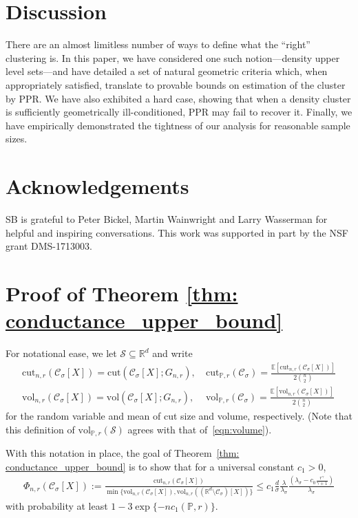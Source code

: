 \documentclass[11pt,twoside]{article}
\newcommand{\vol}{\mathrm{vol}}
\newcommand{\cut}{\mathrm{cut}}
\newcommand{\Reals}{\mathbb{R}}
\newcommand{\Rd}{\Reals^d}
\newcommand{\1}{\mathbf{1}}
\newcommand{\Xbf}{X}             %
\newcommand{\Pbb}{\mathbb{P}}
\newcommand{\Sset}{\mathcal{S}}
\newcommand{\Cset}{\mathcal{C}}
\newcommand{\Csig}{\Cset_{\sigma}}
\begin{document}
\section{Discussion}
\label{sec: discussion}

There are an almost limitless number of ways to define what the ``right''
clustering is. In this paper, we have considered one such notion---density upper
level sets---and have detailed a set of natural geometric criteria which, when 
appropriately satisfied, translate to provable bounds on estimation of the
cluster by PPR. We have also exhibited a hard case, showing that when a density cluster is sufficiently geometrically ill-conditioned, PPR may fail to recover it. Finally, we have empirically demonstrated the tightness of our analysis for reasonable sample sizes. 

\section{Acknowledgements}
SB is grateful to Peter Bickel, Martin Wainwright and Larry Wasserman for helpful and inspiring conversations. This work was supported in part by the NSF grant DMS-1713003.

\appendix

\section{Proof of Theorem \ref{thm: conductance_upper_bound}}
\label{sec: proof_of_theorem_1}

For notational ease, we let $\mathcal{S} \subseteq \Rd$ and write
\begin{align*}
\cut_{n,r}(\Csig[\Xbf]) = \cut(\Csig[\Xbf]; G_{n,r}),& ~ \cut_{\Pbb,r}(\Csig)= \frac{\mathbb{E}[\cut_{n,r}(\Csig[\Xbf])]}{2{n \choose 2}} \\
\vol_{n,r}(\Csig[\Xbf]) = \vol(\Csig[\Xbf]; G_{n,r}),& ~ \vol_{\Pbb,r}(\Csig)= \frac{\mathbb{E}[\vol_{n,r}(\Csig[\Xbf])]}{2{n \choose 2}}
\end{align*}
for the random variable and mean of cut size and volume, respectively. (Note that this definition of $\vol_{\Pbb,r}(\Sset)$ agrees with that of~\eqref{eqn:volume}). 

With this notation in place, the goal of Theorem~\ref{thm: conductance_upper_bound} is to show that for a universal constant $c_1 > 0$,
\begin{align*}
\Phi_{n,r}(\Csig[\Xbf]) := \frac{\cut_{n,r}(\Csig[\Xbf])}{\min\{\vol_{n,r}(\Csig[\Xbf]), \vol_{n,r}((\Rd \setminus \Csig)[\Xbf])\}} \leq c_1 \frac{d}{\sigma}
    \frac{\lambda}{\lambda_{\sigma}} \frac{(\lambda_{\sigma} -
      c_0\frac{r^{\gamma}}{\gamma+1})}{\lambda_{\sigma}}
\end{align*}
with probability at least $1 - 3\exp\{-nc_1(\Pbb,r)\}$.
\end{document}

